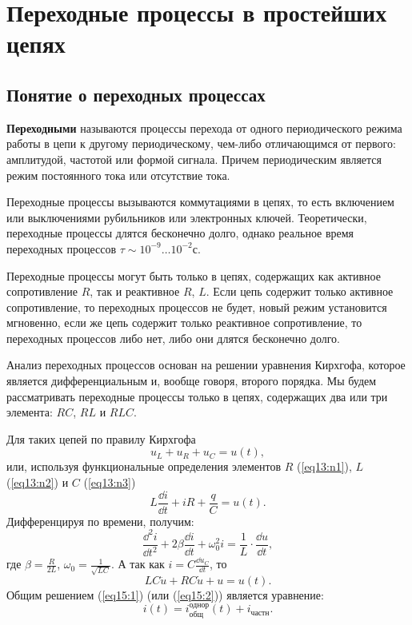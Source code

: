 \chapter{Переходные процессы в простейших цепях}

\section{Понятие о переходных процессах}

	\begin{definition}
        \textbf{Переходными} называются процессы перехода от одного
        периодического режима работы в цепи к другому периодическому, чем-либо
        отличающимся от первого: амплитудой, частотой или формой сигнала. Причем
        периодическим является режим постоянного тока или отсутствие тока.
	\end{definition}
	
	Переходные процессы вызываются коммутациями в цепях, то есть включением или
    выключениями рубильников или электронных ключей. Теоретически, переходные
    процессы длятся бесконечно долго, однако реальное время переходных процессов
    \( \tau \sim 10^{-9}\ldots10^{-2} \)с.
	
	Переходные процессы могут быть только в цепях, содержащих как активное
    сопротивление \( R \), так и реактивное \( R \), \( L \). Если цепь содержит
    только активное сопротивление, то переходных процессов не будет, новый режим
    установится мгновенно, если же цепь содержит только реактивное
    сопротивление, то переходных процессов либо нет, либо они длятся бесконечно
    долго.
    
    Анализ переходных процессов основан на решении уравнения Кирхгофа, которое
    является дифференциальным и, вообще говоря, второго порядка. Мы будем
    рассматривать переходные процессы только в цепях, содержащих два или три
    элемента: \( RC \), \( RL \) и \( RLC \).

	Для таких цепей по правилу Кирхгофа
	\[
        u_L + u_R + u_C = u(t), 
    \]
	или, используя функциональные определения элементов  \( R \)
    (\ref{eq13:n1}), \( L \)  (\ref{eq13:n2}) и \( C \) (\ref{eq13:n3})
	\[
        L\frac{\dd i}{\dd t} + iR + \frac{q}{C} = u(t).
    \]
	Дифференцируя по времени, получим:
	\begin{equation}
		\frac{\dd^2i}{\dd t^2} + 2\beta\frac{\dd i}{\dd t} + \omega_0^2i = 
        \frac{1}{L}\cdot\frac{\dd u}{\dd t},
        \label{eq15:1}
	\end{equation}
	где \( \beta = \frac{R}{2L} \), \( \omega_0 = \frac{1}{\sqrt{LC}} \). А так
    как \( i = C\frac{\dd u_C}{\dd t} \), то
	\begin{equation}
		LC\ddot{u} + RC\dot{u} + u = u(t).
        \label{eq15:2}
	\end{equation}
	Общим решением (\ref{eq15:1}) (или (\ref{eq15:2})) является уравнение:
	\[
        i(t) = i_{\textit{общ}}^{\text{однор}}(t) + i_{\textit{частн}}.
    \]
	
